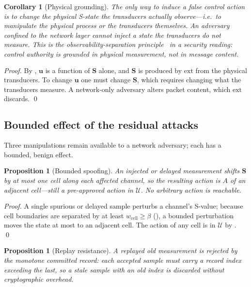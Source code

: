\documentclass[11pt,a4paper,twocolumn]{article}
\theoremstyle{thmstyle}
\newtheorem{proposition}[theorem]{Proposition}
\newtheorem{corollary}[theorem]{Corollary}
\theoremstyle{definition}
\theoremstyle{remark}
\newcommand{\Us}{\mathcal{U}}
\newcommand{\Ss}{\mathbf{S}}
\newcommand{\wcell}{w_{\mathrm{cell}}}
\newcommand{\floor}{\beta}
\begin{document}
\begin{corollary}[Physical grounding]
\label{cor:grounding}
The only way to induce a false control action is to change the physical
S-state the transducers actually observe---i.e.\ to manipulate the
physical process or the transducers themselves. An adversary confined to
the network layer cannot inject a state the transducers do not measure.
This is the observability-separation
principle~\citep{luenberger1979dynamic} in a security reading: control
authority is grounded in physical measurement, not in message content.
\end{corollary}

\begin{proof}
By , $\mathbf u$ is a function of $\Ss$ alone, and $\Ss$
is produced by $\mathrm{ext}$ from the physical transducers. To change
$\mathbf u$ one must change $\Ss$, which requires changing what the
transducers measure. A network-only adversary alters packet content,
which $\mathrm{ext}$ discards. \qed
\end{proof}

\subsection{Bounded effect of the residual attacks}

Three manipulations remain available to a network adversary; each has a
bounded, benign effect.

\begin{proposition}[Bounded spoofing]
\label{prop:spoof}
An injected or delayed measurement shifts $\Ss$ by at most one cell along
each affected channel, so the resulting action is $A$ of an adjacent
cell---still a pre-approved action in $\Us$. No arbitrary action is
reachable.
\end{proposition}

\begin{proof}
A single spurious or delayed sample perturbs a channel's S-value; because
cell boundaries are separated by at least $\wcell\ge\floor$
(), a bounded perturbation moves the state at most to an
adjacent cell. The action of any cell is in $\Us$ by .
\qed
\end{proof}

\begin{proposition}[Replay resistance]
\label{prop:replay}
A replayed old measurement is rejected by the monotone committed record:
each accepted sample must carry a record index exceeding the last, so a
stale sample with an old index is discarded without cryptographic
overhead.
\end{proposition}
\end{document}
